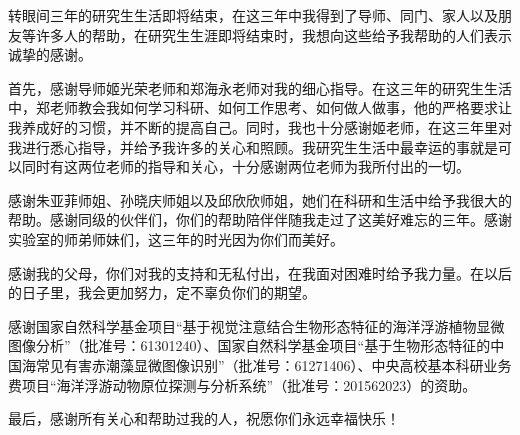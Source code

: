 \begin{acknowledgement}
  
  转眼间三年的研究生生活即将结束，在这三年中我得到了导师、同门、家人以及朋友等许多人的帮助，在研究生生涯即将结束时，我想向这些给予我帮助的人们表示诚挚的感谢。

  首先，感谢导师姬光荣老师和郑海永老师对我的细心指导。在这三年的研究生生活中，郑老师教会我如何学习科研、如何工作思考、如何做人做事，他的严格要求让我养成好的习惯，并不断的提高自己。同时，我也十分感谢姬老师，在这三年里对我进行悉心指导，并给予我许多的关心和照顾。我研究生生活中最幸运的事就是可以同时有这两位老师的指导和关心，十分感谢两位老师为我所付出的一切。

  感谢朱亚菲师姐、孙晓庆师姐以及邱欣欣师姐，她们在科研和生活中给予我很大的帮助。感谢同级的伙伴们，你们的帮助陪伴伴随我走过了这美好难忘的三年。感谢实验室的师弟师妹们，这三年的时光因为你们而美好。

  感谢我的父母，你们对我的支持和无私付出，在我面对困难时给予我力量。在以后的日子里，我会更加努力，定不辜负你们的期望。

  感谢国家自然科学基金项目“基于视觉注意结合生物形态特征的海洋浮游植物显微图像分析”（批准号：61301240）、国家自然科学基金项目“基于生物形态特征的中国海常见有害赤潮藻显微图像识别”（批准号：61271406）、中央高校基本科研业务费项目“海洋浮游动物原位探测与分析系统”（批准号：201562023）的资助。

  最后，感谢所有关心和帮助过我的人，祝愿你们永远幸福快乐！
\end{acknowledgement}
